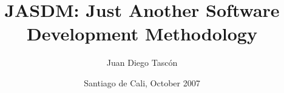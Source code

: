 \title{ JASDM: Just Another Software Development Methodology }

\author{ Juan Diego Tascón }


\date{ Santiago de Cali, October 2007 }
